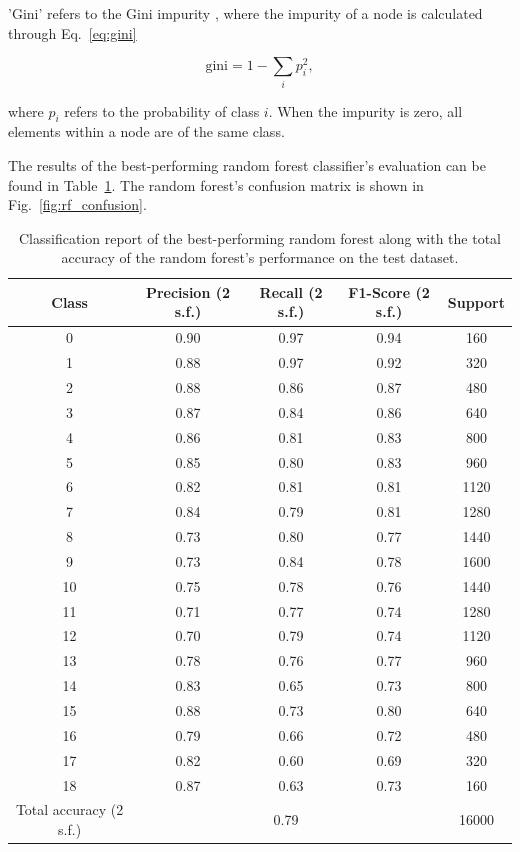 \documentclass[11pt,a4paper]{article}
\begin{document}
'Gini' refers to the Gini impurity \citep{Breiman2017-zt}, where the impurity of a node is calculated through Eq.~\ref{eq:gini}

\begin{equation}
    \mathrm{gini} = 1- \sum_i p^2_i\label{eq:gini},
\end{equation}

where $p_i$ refers to the probability of class $i$. When the impurity is zero, all elements within a node are of the same class.

The results of the best-performing random forest classifier's evaluation can be found in Table~\ref{tab:rf_eval}. The random forest's confusion matrix is shown in Fig.~\ref{fig:rf_confusion}.

\begin{table}[t]
    \centering
    \begin{tabular}{c|c|c|c|c}
        Class & Precision (2 s.f.) & Recall (2 s.f.)& F1-Score (2 s.f.)& Support \\
        \hline
        0  & 0.90 & 0.97 & 0.94 & 160 \\
        1  & 0.88 & 0.97 & 0.92 & 320 \\
        2  & 0.88 & 0.86 & 0.87 & 480 \\
        3  & 0.87 & 0.84 & 0.86 & 640 \\
        4  & 0.86 & 0.81 & 0.83 & 800 \\
        5  & 0.85 & 0.80 & 0.83 & 960 \\
        6  & 0.82 & 0.81 & 0.81 & 1120 \\
        7  & 0.84 & 0.79 & 0.81 & 1280 \\
        8  & 0.73 & 0.80 & 0.77 & 1440 \\
        9  & 0.73 & 0.84 & 0.78 & 1600 \\
        10 & 0.75 & 0.78 & 0.76 & 1440 \\
        11 & 0.71 & 0.77 & 0.74 & 1280 \\
        12 & 0.70 & 0.79 & 0.74 & 1120 \\
        13 & 0.78 & 0.76 & 0.77 & 960 \\
        14 & 0.83 & 0.65 & 0.73 & 800 \\
        15 & 0.88 & 0.73 & 0.80 & 640 \\
        16 & 0.79 & 0.66 & 0.72 & 480 \\
        17 & 0.82 & 0.60 & 0.69 & 320 \\
        18 & 0.87 & 0.63 & 0.73 & 160 \\
        \hline
        Total accuracy (2 s.f.) &\multicolumn{3}{c|}{0.79} & 16000 \\

    \end{tabular}
    \caption{Classification report of the best-performing random forest along with the total accuracy of the random forest's performance on the test dataset.}\label{tab:rf_eval}
\end{table}
\end{document}
